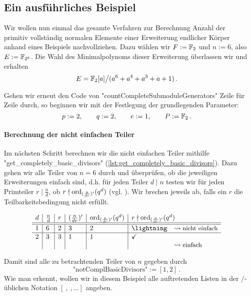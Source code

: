 \subsection{Ein ausführliches Beispiel}

Wir wollen nun einmal das gesamte Verfahren zur Berechnung Anzahl 
der primitiv vollständig normalen Elemente einer Erweiterung endlicher Körper
anhand eines Beispiels nachvollziehen. Dazu wählen wir $F := \mathbb{F}_2$ und 
$n := 6$, also $E := \mathbb{F}_{2^6}$. Die Wahl des Minimalpolynoms dieser Erweiterung
überlassen wir \sage und erhalten 
\[ E = \mathbb{F}_2[a] \big/ ( a^6 + a^4 + a^3 + a + 1 ) \,.\]

Gehen wir erneut den Code von "countCompleteSubmoduleGenerators"
Zeile für Zeile durch, so beginnen wir mit der Festlegung der grundlegenden
Parameter:
\[ p := 2,\qquad q := 2,\qquad e := 1,\qquad P := \mathbb{F}_2\,.\]


\paragraph{Berechnung der nicht einfachen Teiler} Im nächsten Schritt berechnen
wir die nicht einfachen Teiler mithilfe "get_completely_basic_divisors" 
(\autoref{lst:get_completely_basic_divisors}).
Dazu gehen wir alle Teiler von $n=6$ durch und überprüfen, ob die jeweiligen
Erweiterungen einfach sind, d.h. für jeden Teiler $d \mid n$ testen wir für
jeden Primteiler $r \mid \tfrac{n}{d}$, ob $r \nmid \operatorname{ord}_{(\frac{n}{dr})'}(q^d)$
(vgl. ). Wir brechen jeweils ab, falls ein
$r$ die Teilbarkeitsbedingung nicht erfüllt.

\[ \begin{array}{l|l|l|l|l|ll} 
  d & \frac{n}{d} & r & (\frac{n}{dr})' & \ord_{(\frac{n}{dr})'}(q^d) & 
    \multicolumn{2}{l}{r \nmid \ord_{(\frac{n}{dr})'}(q^d)}\\\hline\hline
  1 & 6 & 2 & 3 & 2 & \lightning &\leadsto\text{\small nicht einfach}\\\hline
  2 & 3 & 3 & 1 & 1 & \checkmark\\
  &&&&&& \leadsto\text{\small einfach}
  \end{array}\]

Damit sind alle zu betrachtenden Teiler von $n$ gegeben durch
\[ \text{"notComplBasicDivisors"} := [1,2]\,. \]
Wie man erkennt, wollen wir in diesem Beispiel alle auftretenden Listen in der
\python/\sage-üblichen Notation $[\ ,\ ,\ldots]$ angeben.


